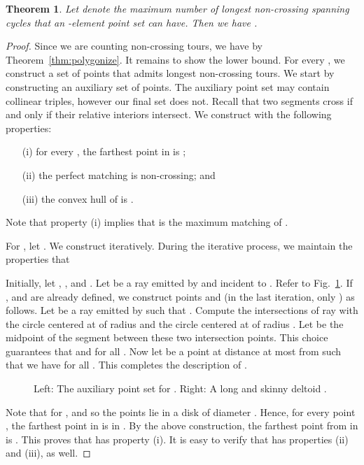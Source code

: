 \documentclass[11pt]{article}
\newtheorem{theorem}{Theorem}
\begin{document}
\begin{theorem} \label{thm:max-tours}
Let  denote the maximum number of longest non-crossing
spanning cycles that an -element point set can have.
Then we have
.
\end{theorem}
\begin{proof}
Since we are counting non-crossing tours,
we have  by Theorem~\ref{thm:polygonize}.
It remains to show the lower bound. For every , we
construct a set  of  points that admits 
longest non-crossing tours. We start by constructing an auxiliary
set  of  points. The auxiliary point set  may contain
collinear triples, however our final set  does not.
Recall that two segments cross if and only if their relative interiors intersect.
We construct  with the following properties:
\begin{itemize}\itemsep -2pt
\item[{\rm (i)}] for every , the farthest point in  is ;
\item[{\rm (ii)}] the perfect matching  is non-crossing; and
\item[{\rm (iii)}] the convex hull of  is .
\end{itemize}
Note that property (i) implies that  is the maximum matching of .

For , let .
We construct  iteratively. During the
iterative process, we maintain the properties that

Initially, let , ,
and . Let  be a ray emitted by  and incident
to . Refer to Fig.~\ref{fig:longcycle}.
If ,  and  are already defined, we construct points
 and  (in the last iteration, only )
as follows. Let  be a ray emitted
by  such that .
Compute the intersections of ray  with the circle centered at 
of radius  and the circle centered at  of radius
. Let  be the midpoint of
the segment between these two intersection points.
This choice guarantees that
 and  for all .
Now let  be a point at distance at most
 from  such that we have
 for all .
This completes the description of .


\begin{figure}[htbp]
\centerline{\epsfysize=1.5in }
\caption{Left: The auxiliary point set  for .
Right: A long and skinny deltoid .}
\label{fig:longcycle}
\end{figure}

Note that  for , and so
the points  lie in a disk of diameter .
Hence, for every point , the farthest point in  is
in . By the above construction, the farthest point from 
in  is . This proves that  has property (i). It is easy
to verify that  has properties (ii) and (iii), as well.


\end{proof}
\end{document}
